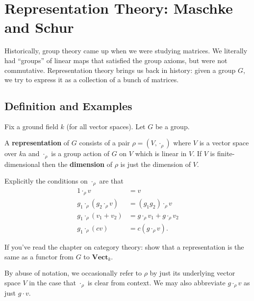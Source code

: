 \chapter{Representation Theory: Maschke and Schur}

Historically, group theory came up when we were studying matrices.
We literally had ``groups'' of linear maps that satisfied the group axioms,
but were not commutative.
Representation theory brings us back in history: given a group $G$,
we try to express it as a collection of a bunch of matrices.

\section{Definition and Examples}
Fix a ground field $k$ (for all vector spaces).  
Let $G$ be a group.

\begin{definition}
	A \textbf{representation} of $G$
	consists of a pair $\rho = (V, \cdot_\rho)$
	where $V$ is a vector space over $k$a
	and $\cdot_\rho$ is a group action of $G$ on $V$ which is linear in $V$.
	If $V$ is finite-dimensional then the \textbf{dimension} of $\rho$ is just the dimension of $V$.
\end{definition}
Explicitly the conditions on $\cdot_\rho$ are that
\[
	\begin{aligned}
		1 \cdot_\rho v &= v \\
		g_1 \cdot_\rho (g_2 \cdot_\rho v) &= (g_1g_2) \cdot_\rho v \\
		g_1 \cdot_\rho (v_1 + v_2) &= g \cdot_\rho v_1 + g \cdot_\rho v_2 \\
		g_1 \cdot_\rho (cv) &= c(g \cdot_\rho v).
	\end{aligned}
\]

\begin{ques}
	If you've read the chapter on category theory:
	show that a representation is the same as a functor from $G$
	to $\mathbf{Vect}_k$.
\end{ques}

By abuse of notation, we occasionally refer to $\rho$ by just its underlying vector space $V$ in the case that $\cdot_\rho$ is clear from context.
We may also abbreviate $g \cdot_\rho v$ as just $g \cdot v$.

